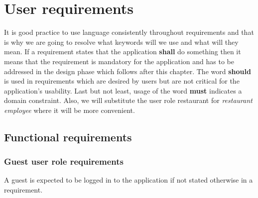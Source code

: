 \newpage

\section{User requirements}
It is good practice to use language consistently throughout requirements and that is why we are going to resolve what keywords will we use and what will they mean.
If a requirement states that the application \textbf{shall} do something then it means that the requirement is mandatory for the application and has to be addressed in the design phase which follows after this chapter. 
The word \textbf{should} is used in requirements which are desired by users but are not critical for the application's usability.
Last but not least, usage of the word \textbf{must} indicates a domain constraint.
Also, we will substitute the user role restaurant for \emph{restaurant employee} where it will be more convenient.

\subsection{Functional requirements}
\subsubsection{Guest user role requirements}
A guest is expected to be logged in to the application if not stated otherwise in a requirement.

